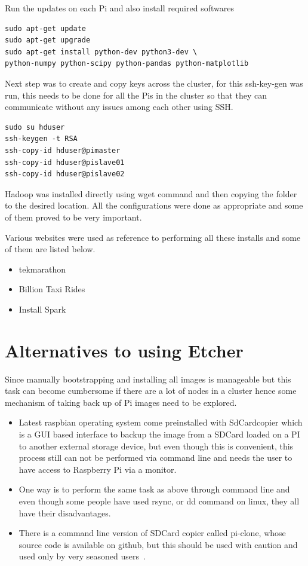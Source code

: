 Run the updates on each Pi and also install required softwares

\begin{verbatim}
sudo apt-get update
sudo apt-get upgrade
sudo apt-get install python-dev python3-dev \
python-numpy python-scipy python-pandas python-matplotlib
\end{verbatim}

Next step was to create and copy keys across the cluster, for this
ssh-key-gen was run, this needs to be done for all the Pis in the
cluster so that they can communicate without any issues among each
other using SSH.

\begin{verbatim}
sudo su hduser
ssh-keygen -t RSA
ssh-copy-id hduser@pimaster
ssh-copy-id hduser@pislave01
ssh-copy-id hduser@pislave02
\end{verbatim}

Hadoop was installed directly using wget command and then copying the
folder to the desired location.  All the configurations were done as
appropriate and some of them proved to be very important.

Various websites were used as reference to performing all these
installs and some of them are listed below.

\begin{itemize}
\item tekmarathon~\cite{hid-sp18-510-pisetup-1}
\item Billion Taxi Rides~\cite{hid-sp18-510-pisetup-2}
\item Install Spark~\cite{hid-sp18-510-pisetup-3}
\end{itemize}

\section{Alternatives to using Etcher}

Since manually bootstrapping and installing all images is manageable
but this task can become cumbersome if there are a lot of nodes in a
cluster hence some mechanism of taking back up of Pi images need to be
explored.

\begin{itemize}
\item Latest raspbian operating system come preinstalled with
  SdCardcopier which is a GUI based interface to backup the image from
  a SDCard loaded on a PI to another external storage device, but even
  though this is convenient, this process still can not be performed
  via command line and needs the user to have access to Raspberry Pi
  via a monitor.
\item One way is to perform the same task as above through command
  line and even though some people have used rsync, or dd command on
  linux, they all have their disadvantages.
\item There is a command line version of SDCard copier called
  pi-clone, whose source code is available on github, but this should
  be used with caution and used only by very seasoned
  users~\cite{hid-sp18-510-git}.
\end{itemize}

